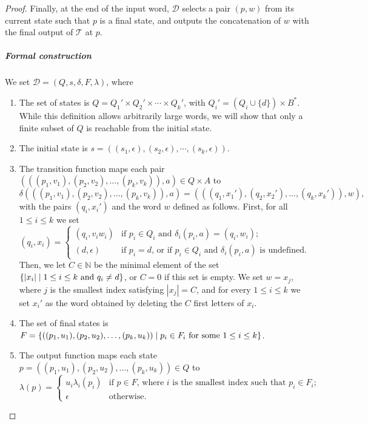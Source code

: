 \documentclass[a4paper,UKenglish,cleveref, autoref, thm-restate,authorcolumns, colorlinks]{lipics-v2021}
\newcommand\calD{\mathcal{D}}
\newcommand{\trans}{\mathcal{T}}
\begin{document}
{\begin{proof}
    Finally, at the end of the input word,
    $\calD$ selects a pair $(p,w)$
    from its current state such that $p$ is a final state,
    and outputs the concatenation of $w$ with the final output of $\trans$ at $p$.

    \subparagraph*{Formal construction}
    We set $\calD = (Q,s,\delta,F,\lambda)$, where
    \begin{enumerate}
        \item The set of states is $Q = Q_1' \times Q_2' \times \cdots \times Q_k'$,
        with
        $Q_i' = (Q_i \cup \{d\}) \times B^*$.
        While this definition allows arbitrarily large words,
        we will show that only a finite subset of $Q$ is reachable from the initial state.
        \item
        The initial state is $s = ((s_1,\epsilon),(s_2,\epsilon),\cdots,(s_k,\epsilon))$.
        \item The transition function maps each pair $(((p_1,v_1), (p_2,v_2), \ldots, (p_k,v_k)),a) \in Q \times A$ to
        \[
            \delta(((p_1,v_1), (p_2,v_2), \ldots, (p_k,v_k)),a)
            = (((q_1,x_1'), (q_2,x_2'), \ldots, (q_k,x_k')),w),
        \]
        with the pairs $(q_i,x_i')$ and the word $w$ defined as follows.
        First, for all $1 \leq i \leq k$ we set
        \[
        (q_i,x_i) =
        \begin{cases}
        (q_i,v_iw_i) & \text{if } p_i \in Q_i \text{ and } \delta_i(p_i,a) = (q_i,w_i); \\
        (d,\epsilon) & \text{if } p_i = d \text{, or if } p_i \in Q_i \text{ and } \delta_i(p_i,a) \text{ is undefined.}
        \end{cases}
        \]
        Then, we let $C \in \mathbb{N}$ be the minimal element of the set 
        $\{|x_{i}| \mid 1 \leq i \leq k \textup{ and } q_i \neq d\}$,
        or $C = 0$ if this set is empty.
        We set $w = x_j$, where $j$ is the smallest index satisfying $|x_j| = C$,
        and for every $1 \leq i \leq k$
        we set $x_i'$ as the word obtained by deleting the $C$ first letters of $x_i$.
        \item The set of final states is 
        $F = \{((p_1,u_1), (p_2,u_2), \ldots, (p_k,u_k)) \mid p_i \in F_i \textup{ for some } 1 \leq i \leq k\}$.
        \item The output function maps each state $p = ((p_1,u_1), (p_2,u_2), \ldots, (p_k,u_k)) \in Q$
        to
        \[
        \lambda(p) =
        \begin{cases}
        u_i \lambda_i(p_i) &  \text{if } p \in F \text{, where $i$ is the smallest index such that } p_i \in F_i; \\
        \epsilon & \text{otherwise}.
        \end{cases}
        \]
    \end{enumerate}
    


\end{proof}}
\end{document}
